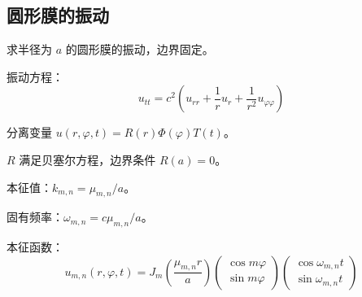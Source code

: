 \subsection{圆形膜的振动}

\begin{lizi}{}{}
求半径为 $a$ 的圆形膜的振动，边界固定。

\begin{jie}
    振动方程：
    \begin{equation}
        u_{tt} = c^2\left(u_{rr} + \frac{1}{r}u_r + \frac{1}{r^2}u_{\varphi\varphi}\right)
    \end{equation}
    
    分离变量 $u(r, \varphi, t) = R(r)\Phi(\varphi)T(t)$。
    
    $R$ 满足贝塞尔方程，边界条件 $R(a) = 0$。
    
    本征值：$k_{m,n} = \mu_{m,n}/a$。
    
    固有频率：$\omega_{m,n} = c\mu_{m,n}/a$。
    
    本征函数：
    \begin{equation}
        u_{m,n}(r, \varphi, t) = J_m\left(\frac{\mu_{m,n}r}{a}\right)\begin{pmatrix}
            \cos m\varphi \\
            \sin m\varphi
        \end{pmatrix}\begin{pmatrix}
            \cos\omega_{m,n}t \\
            \sin\omega_{m,n}t
        \end{pmatrix}
    \end{equation}
\end{jie}
\end{lizi}

